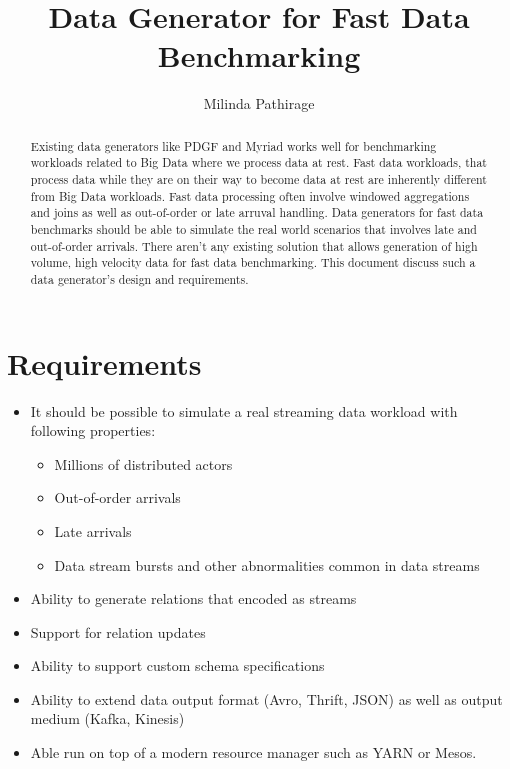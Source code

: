 \documentclass{thesis}
\title{Data Generator for Fast Data Benchmarking}
\author{Milinda Pathirage}
\begin{document}
\maketitle


\begin{abstract}
Existing data generators like PDGF and Myriad works well for benchmarking workloads related to Big Data where we process data at rest. Fast data workloads, that process data while they are on their way to become data at rest are inherently different from Big Data workloads. Fast data processing often involve windowed aggregations and joins as well as out-of-order or late arruval handling. Data generators for fast data benchmarks should be able to simulate the real world scenarios that involves late and out-of-order arrivals. There aren't any existing solution that allows generation of high volume, high velocity data for fast data benchmarking. This document discuss such a data generator's design and requirements.
\end{abstract}

\section{Requirements}

\begin{itemize}
	\item It should be possible to simulate a real streaming data workload with following properties:
	\begin{itemize}
	 	\item Millions of distributed actors
	 	\item Out-of-order arrivals
	 	\item Late arrivals
	 	\item Data stream bursts and other abnormalities common in data streams
	 \end{itemize} 
	\item Ability to generate relations that encoded as streams
	\item Support for relation updates
	\item Ability to support custom schema specifications
	\item Ability to extend data output format (Avro, Thrift, JSON) as well as output medium (Kafka, Kinesis)
	\item Able run on top of a modern resource manager such as YARN or Mesos.
\end{itemize}
\end{document}
